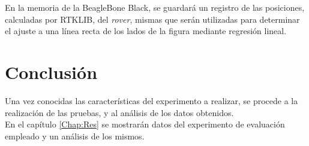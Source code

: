 En la memoria de la BeagleBone Black, se guardará un registro de las posiciones, calculadas por RTKLIB, del \textit{rover}, mismas que serán utilizadas para determinar el ajuste a una línea recta de los lados de la figura mediante regresión lineal.

\section{Conclusión}

Una vez conocidas las características del experimento a realizar, se procede a la realización de las pruebas, y al análisis de los datos obtenidos.\\

En el capítulo \ref{Chap:Res} se mostrarán datos del experimento de evaluación empleado y un análisis de los mismos.